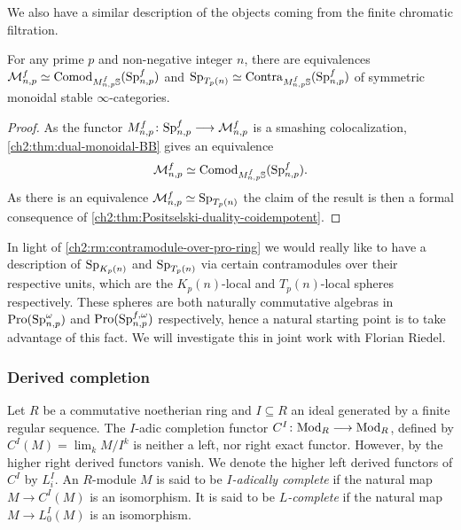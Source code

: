 We also have a similar description of the objects coming from the finite chromatic filtration. 

\begin{proposition}
    For any prime $p$ and non-negative integer $n$, there are equivalences $\mathcal{M}_{n,p}^f \simeq \mathrm{Comod}_{M_{n,p}^f\mathbb{S}}(\mathrm{Sp}_{n,p}^f)$ and $\mathrm{Sp}_{T_p(n)}\simeq \mathrm{Contra}_{M_{n,p}^f\mathbb{S}}(\mathrm{Sp}_{n,p}^f)$ of symmetric monoidal stable $\infty$-categories. 
\end{proposition}
\begin{proof}
    As the functor $M_{n,p}^f\colon \mathrm{Sp}_{n,p}^f \longrightarrow \mathcal{M}_{n,p}^f$ is a smashing colocalization, \cref{ch2:thm:dual-monoidal-BB} gives an equivalence 
    \[\mathcal{M}_{n,p}^f \simeq \mathrm{Comod}_{M_{n,p}^f \mathbb{S}}(\mathrm{Sp}_{n,p}^f).\]
    As there is an equivalence $\mathcal{M}_{n,p}^f \simeq \mathrm{Sp}_{T_p(n)}$ the claim of the result is then a formal consequence of \cref{ch2:thm:Positselski-duality-coidempotent}.
\end{proof}

\begin{remark}
    In light of \cref{ch2:rm:contramodule-over-pro-ring} we would really like to have a description of $\mathrm{Sp}_{{K_p(n)}}$ and $\mathrm{Sp}_{T_p(n)}$ via certain contramodules over their respective units, which are the $K_p(n)$-local and $T_p(n)$-local spheres respectively. These spheres are both naturally commutative algebras in $\operatorname{Pro}(\mathrm{Sp}_{n,p}^\omega)$ and $\operatorname{Pro}(\mathrm{Sp}_{n,p}^{f, \omega})$ respectively, hence a natural starting point is to take advantage of this fact. We will investigate this in joint work with Florian Riedel. 
\end{remark}

\subsubsection*{Derived completion}
\label{ch2:ssec:derived-completion}

Let $R$ be a commutative noetherian ring and $I\subseteq R$ an ideal generated by a finite regular sequence. The $I$-adic completion functor $C^I\colon \mathrm{Mod}_R \longrightarrow \mathrm{Mod}_R$, defined by $C^I(M)=\lim_k M/I^k$ is neither a left, nor right exact functor. However, by \cite[5.1]{greenlees-may_92} the higher right derived functors vanish. We denote the higher left derived functors of $C^I$ by $L^I_i$. An $R$-module $M$ is said to be \emph{$I$-adically complete} if the natural map $M\to C^I (M)$ is an isomorphism. It is said to be \emph{$L$-complete} if the natural map $M\to L_0^I(M)$ is an isomorphism. 

